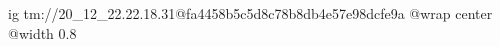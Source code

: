  
 
 
 
 

\qqSecOrig


\ifcmt
  ig tm://20_12_22.22.18.31@fa4458b5c5d8c78b8db4e57e98dcfe9a
  @wrap center
  @width 0.8
\fi


